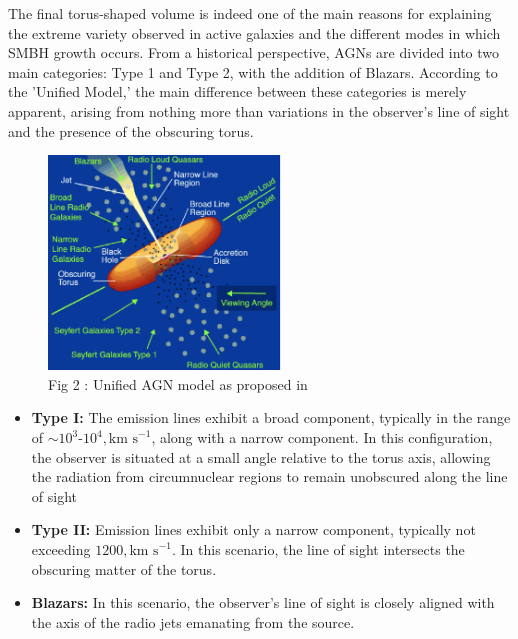 The final torus-shaped volume is indeed one of the main reasons for explaining the extreme variety observed in active galaxies and the different modes in which SMBH growth occurs. From a historical perspective, AGNs are divided into two main categories: Type 1 and Type 2, with the addition of Blazars. According to the 'Unified Model,' the main difference between these categories is merely apparent, arising from nothing more than variations in the observer's line of sight and the presence of the obscuring torus.

\begin{figure}[b]
  \centering
  \includegraphics[width=0.55\textwidth]{UnifiedAGNmodel}
  \caption{Fig 2 : Unified AGN model as proposed in \cite{1995PASP..107..803U}}
  \label{2}
\end{figure}


\begin{itemize}
  \item \textbf{Type I:} The emission lines exhibit a broad component, typically in the range of $\sim 10^{3}$-$10^{4}, \text{km s}^{-1}$, along with a narrow component. In this configuration, the observer is situated at a small angle relative to the torus axis, allowing the radiation from circumnuclear regions to remain unobscured along the line of sight
  
  \item \textbf{Type II:} Emission lines exhibit only a narrow component, typically not exceeding $1200 , \text{km s}^{-1}$. In this scenario, the line of sight intersects the obscuring matter of the torus.
  
  \item \textbf{Blazars:} In this scenario, the observer's line of sight is closely aligned with the axis of the radio jets emanating from the source.
\end{itemize}

